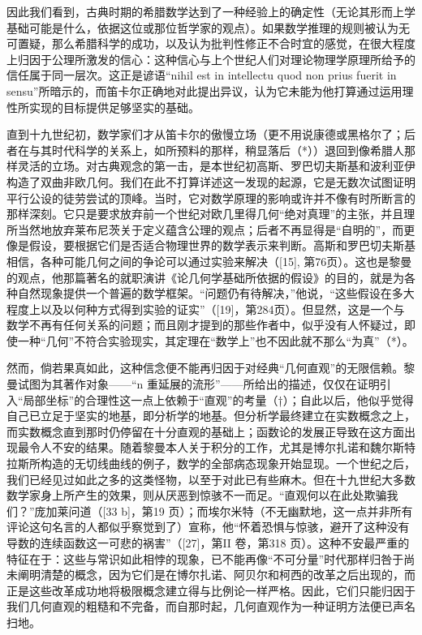 因此我们看到，古典时期的希腊数学达到了一种经验上的确定性（无论其形而上学基础可能是什么，依据这位或那位哲学家的观点）。如果数学推理的规则被认为无可置疑，那么希腊科学的成功，以及认为批判性修正不合时宜的感觉，在很大程度上归因于公理所激发的信心：这种信心与上个世纪人们对理论物理学原理所给予的信任属于同一层次。这正是谚语“nihil est in intellectu quod non prius fuerit in sensu”所暗示的，而笛卡尔正确地对此提出异议，认为它未能为他打算通过运用理性所实现的目标提供足够坚实的基础。

直到十九世纪初，数学家们才从笛卡尔的傲慢立场（更不用说康德或黑格尔了；后者在与其时代科学的关系上，如所预料的那样，稍显落后（*））退回到像希腊人那样灵活的立场。对古典观念的第一击，是本世纪初高斯、罗巴切夫斯基和波利亚伊构造了双曲非欧几何。我们在此不打算详述这一发现的起源，它是无数次试图证明平行公设的徒劳尝试的顶峰。当时，它对数学原理的影响或许并不像有时所断言的那样深刻。它只是要求放弃前一个世纪对欧几里得几何“绝对真理”的主张，并且理所当然地放弃莱布尼茨关于定义蕴含公理的观点；后者不再显得是“自明的”，而更像是假设，要根据它们是否适合物理世界的数学表示来判断。高斯和罗巴切夫斯基相信，各种可能几何之间的争论可以通过实验来解决（{[}15{]}, 第76页）。这也是黎曼的观点，他那篇著名的就职演讲《论几何学基础所依据的假设》的目的，就是为各种自然现象提供一个普遍的数学框架。“问题仍有待解决，”他说，“这些假设在多大程度上以及以何种方式得到实验的证实”（{[}19{]}，第284页）。但显然，这是一个与数学不再有任何关系的问题；而且刚才提到的那些作者中，似乎没有人怀疑过，即使一种“几何”不符合实验现实，其定理在“数学上”也不因此就不那么“为真”（*）。

然而，倘若果真如此，这种信念便不能再归因于对经典“几何直观”的无限信赖。黎曼试图为其著作对象——“n 重延展的流形”——所给出的描述，仅仅在证明引入“局部坐标”的合理性这一点上依赖于“直观”的考量（†）；自此以后，他似乎觉得自己已立足于坚实的地基，即分析学的地基。但分析学最终建立在实数概念之上，而实数概念直到那时仍停留在十分直观的基础上；函数论的发展正导致在这方面出现最令人不安的结果。随着黎曼本人关于积分的工作，尤其是博尔扎诺和魏尔斯特拉斯所构造的无切线曲线的例子，数学的全部病态现象开始显现。一个世纪之后，我们已经见过如此之多的这类怪物，以至于对此已有些麻木。但在十九世纪大多数数学家身上所产生的效果，则从厌恶到惊骇不一而足。“直观何以在此处欺骗我们？”庞加莱问道（{[}33 b{]}，第19 页）；而埃尔米特（不无幽默地，这一点并非所有评论这句名言的人都似乎察觉到了）宣称，他“怀着恐惧与惊骇，避开了这种没有导数的连续函数这一可悲的祸害”（{[}27{]}，第II 卷，第318 页）。这种不安最严重的特征在于：这些与常识如此相悖的现象，已不能再像“不可分量”时代那样归咎于尚未阐明清楚的概念，因为它们是在博尔扎诺、阿贝尔和柯西的改革之后出现的，而正是这些改革成功地将极限概念建立得与比例论一样严格。因此，它们只能归因于我们几何直观的粗糙和不完备，而自那时起，几何直观作为一种证明方法便已声名扫地。

